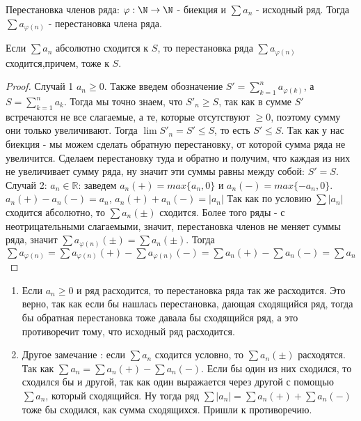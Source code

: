

\begin{definition} \thmslashn 

Перестановка членов ряда: $\varphi: \N \to \N$ - биекция и $\sum a_n$ - исходный ряд. Тогда $\sum a_{\varphi(n)}$ - перестановка члена ряда.\\
\end{definition}

\begin{theorem}\thmslashn

Если $\sum a_n$ абсолютно сходится к $S$, то перестановка ряда $\sum a_{\varphi(n)} $ сходится,причем, тоже к $S$.
\end{theorem}

\begin{proof}\thmslashn

 Случай 1 $a_n \ge 0$. Также введем обозначение $S' =\sum_{k=1}^n a_{\varphi(k)} $, а $S = \sum_ {k=1}^n a_k$. Тогда мы точно знаем, что $S'_n \ge S$, так как в сумме $S'$ встречаются не все слагаемые, а те, которые отсутствуют $\ge 0$, поэтому сумму они только увеличивают. Тогда $\lim S'_n = S' \leq S$, то есть $S' \le S$. Так как у нас биекция - мы можем сделать обратную перестановку, от которой сумма ряда не увеличится. Сделаем перестановку туда и обратно и получим, что каждая из них не увеличивает сумму ряда, ну значит эти суммы равны между собой: $S'=S$. \\
Случай 2: $a_n \in \mathbb{R}$: заведем $a_n(+) = max \{a_n,0\}$ и $a_n(-)=max \{-a_n,0\}$. $a_n(+)-a_n(-)=a_n$, $a_n(+)+a_n(-)=|a_n|$
Так как по условию $\sum |a_n|$ сходится абсолютно, то $\sum a_n(\pm)$ сходится. Более того ряды - с неотрицательными слагаемыми, значит, перестановка членов не меняет суммы ряда, значит $\sum a_{\varphi(n)}(\pm) = \sum a_n(\pm)$. Тогда $\sum a_{\varphi(n)} = \sum a_{\varphi(n)}(+)-\sum a_{\varphi(n)}(-)=\sum a_n (+) - \sum a_n(-)= \sum a_n$\\
\end{proof}

\begin{remark}\thmslashn

	\begin{enumerate}

		\item Если $a_n \ge 0$ и ряд расходится, то перестановка ряда так же расходится. Это верно, так как если бы нашлась перестановка, дающая сходящийся ряд, тогда бы обратная перестановка тоже давала бы сходящийся ряд, а это противоречит тому, что исходный ряд расходится.\\
		\item Другое замечание : если $\sum a_n$ сходится условно, то $\sum a_n(\pm)$ расходятся. Так как $\sum a_n = \sum a_n (+) - \sum a_n(-)$. Если бы один из них сходился, то сходился бы и другой, так как один выражается через другой с помощью $\sum a_n$, который сходящийся. Ну тогда ряд $\sum |a_n| = \sum a_n (+) + \sum a_n(-)$ тоже бы сходился, как сумма сходящихся. Пришли к противоречию.
	\end{enumerate}
\end{remark}